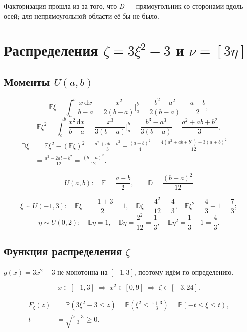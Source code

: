 \documentclass[12pt]{article}
\begin{document}
Факторизация прошла из-за того, что $D$ --- прямоугольник со сторонами вдоль осей;
для непрямоугольной области её бы не было.

\section{Распределения $\zeta = 3\xi^2 - 3$ и $\nu = [3\eta]$}

\subsection{Моменты $U(a,b)$}

\[
    \mathbb{E}\xi = \int_{a}^{b} \frac{x\,\mathrm{d}x}{b-a}
    = \frac{x^2}{2(b-a)}\bigg|_{a}^{b}
    = \frac{b^2-a^2}{2(b-a)} = \frac{a+b}{2},
\]
\[
    \mathbb{E}\xi^2 = \int_{a}^{b} \frac{x^2\,\mathrm{d}x}{b-a}
    = \frac{x^3}{3(b-a)}\bigg|_{a}^{b}
    = \frac{b^3-a^3}{3(b-a)} = \frac{a^2+ab+b^2}{3},
\]
\begin{align*}
    \mathbb{D}\xi &= \mathbb{E}\xi^2 - (\mathbb{E}\xi)^2
    = \frac{a^2+ab+b^2}{3} - \frac{(a+b)^2}{4}
    = \frac{4(a^2+ab+b^2) - 3(a+b)^2}{12} = \\
    &= \frac{a^2 - 2ab + b^2}{12} = \frac{(b-a)^2}{12}.
\end{align*}

\[
    \boxed{\; U(a,b): \quad \mathbb{E} = \frac{a+b}{2}, \qquad \mathbb{D} = \frac{(b-a)^2}{12} \;}
\]

\[
    \xi \sim U(-1,3): \quad
    \mathbb{E}\xi = \frac{-1+3}{2} = 1, \quad
    \mathbb{D}\xi = \frac{4^2}{12} = \frac{4}{3}, \quad
    \mathbb{E}\xi^2 = \frac{4}{3} + 1 = \frac{7}{3};
\]
\[
    \eta \sim U(0,2): \quad
    \mathbb{E}\eta = 1, \quad \mathbb{D}\eta = \frac{2^2}{12} = \frac{1}{3}, \quad
    \mathbb{E}\eta^2 = \frac{1}{3} + 1 = \frac{4}{3}.
\]

\subsection{Функция распределения $\zeta$}

$g(x) = 3x^2-3$ не монотонна на $[-1,3]$, поэтому идём по определению.

\[
    x \in [-1,3] \;\Rightarrow\; x^2 \in [0,9] \;\Rightarrow\; \zeta \in [-3, 24].
\]

\begin{align*}
    F_\zeta(z) &= \mathbb{P}(3\xi^2 - 3 \le z)
    = \mathbb{P}\!\left(\xi^2 \le \frac{z+3}{3}\right)
    = \mathbb{P}(-t \le \xi \le t), \\
    t &= \sqrt{\frac{z+3}{3}} \ge 0.
\end{align*}
\end{document}
